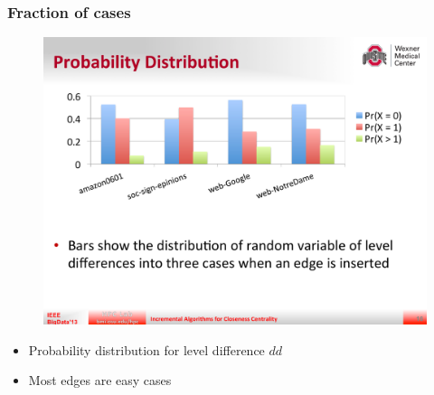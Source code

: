 \begin{frame}
  \frametitle{Fraction of cases}

  \begin{figure}[H]
    \centering
    \includegraphics[width=\textwidth, height=0.5\textheight, keepaspectratio]{imgs/sksc-results1}
  \end{figure}

  \begin{itemize}
    \item Probability distribution for level difference $dd$
    \item Most edges are easy cases
  \end{itemize}
\end{frame}
    
